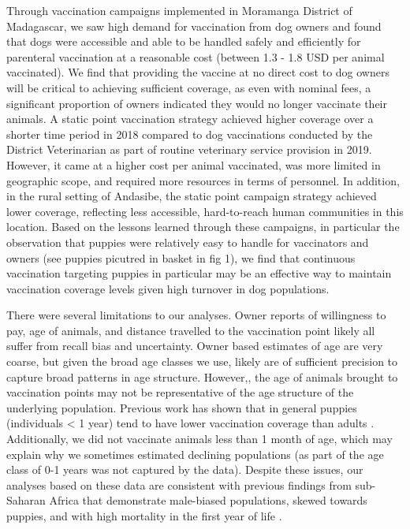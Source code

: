 \documentclass[tropicalmed,article,submit,moreauthors,pdftex]{mdpi}
\begin{document}
Through vaccination campaigns implemented in Moramanga District of
Madagascar, we saw high demand for vaccination from dog owners and found
that dogs were accessible and able to be handled safely and efficiently
for parenteral vaccination at a reasonable cost (between 1.3 - 1.8 USD
per animal vaccinated). We find that providing the vaccine at no direct
cost to dog owners will be critical to achieving sufficient coverage, as
even with nominal fees, a significant proportion of owners indicated
they would no longer vaccinate their animals. A static point vaccination
strategy achieved higher coverage over a shorter time period in 2018
compared to dog vaccinations conducted by the District Veterinarian as
part of routine veterinary service provision in 2019. However, it came
at a higher cost per animal vaccinated, was more limited in geographic
scope, and required more resources in terms of personnel. In addition,
in the rural setting of Andasibe, the static point campaign strategy
achieved lower coverage, reflecting less accessible, hard-to-reach human
communities in this location. Based on the lessons learned through these
campaigns, in particular the observation that puppies were relatively
easy to handle for vaccinators and owners (see puppies picutred in
basket in fig 1), we find that continuous vaccination targeting puppies
in particular may be an effective way to maintain vaccination coverage
levels given high turnover in dog populations.

There were several limitations to our analyses. Owner reports of
willingness to pay, age of animals, and distance travelled to the
vaccination point likely all suffer from recall bias and uncertainty.
Owner based estimates of age are very coarse, but given the broad age
classes we use, likely are of sufficient precision to capture broad
patterns in age structure. However,, the age of animals brought to
vaccination points may not be representative of the age structure of the
underlying population. Previous work has shown that in general puppies
(individuals \textless{} 1 year) tend to have lower vaccination coverage
than adults
\citep{arief2016, sanchez-soriano2020, mazeri2019, minyoo2015}.
Additionally, we did not vaccinate animals less than 1 month of age,
which may explain why we sometimes estimated declining populations (as
part of the age class of 0-1 years was not captured by the data).
Despite these issues, our analyses based on these data are consistent
with previous findings from sub-Saharan Africa that demonstrate
male-biased populations, skewed towards puppies, and with high mortality
in the first year of life \citep{czupryna2016, taylor2017}.
\end{document}

